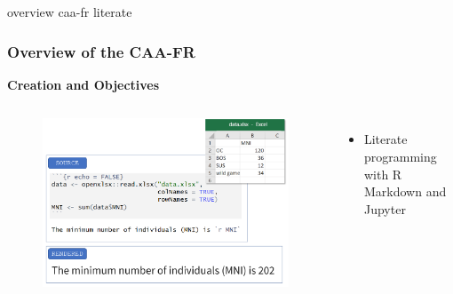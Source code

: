\documentclass[t,aspectratio=169,xcolor=dvipsnames]{beamer}
\begin{document}
\begin{frame}{overview caa-fr literate}

    \frametitle{Overview of the CAA-FR} 

    \begin{block}{\textbf{Creation and Objectives}} %
    \end{block}

    \begin{columns}[t]
    	
    	
    	\begin{figure}
    		\includegraphics[height=0.48\textheight]{figures/literate-programming.png}
    	\end{figure}
    	
    	
    	\begin{itemize}
    		\item Literate programming with R Markdown and Jupyter
    	\end{itemize}
    	
    \end{columns}

    \end{frame}

\end{document}
